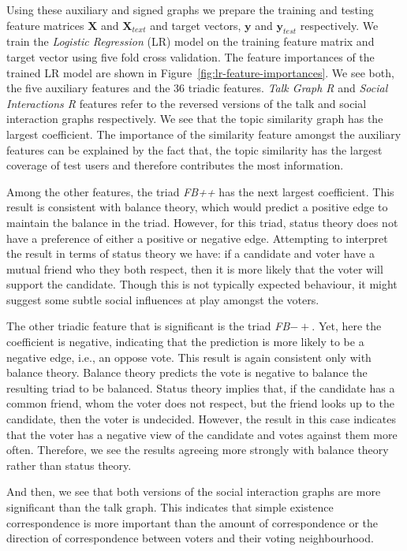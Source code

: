 Using these auxiliary and signed graphs we prepare the training and testing feature matrices $\mathbf{X}$ and $\mathbf{X}_{text}$ and target vectors, $\mathbf{y}$ and $\mathbf{y}_{test}$ respectively.
We train the \textit{Logistic Regression} (LR) model on the training feature matrix and target vector using five fold cross validation.
The feature importances of the trained LR model are shown in Figure~\ref{fig:lr-feature-importances}.
We see both, the five auxiliary features and the 36 triadic features.
\textit{Talk Graph R} and \textit{Social Interactions R} features refer to the reversed versions of the talk and social interaction graphs respectively.
We see that the topic similarity graph has the largest coefficient.
The importance of the similarity feature amongst the auxiliary features can be explained by the fact that, the topic similarity has the largest coverage of test users and therefore contributes the most information.

Among the other features, the triad \textit{FB++} has the next largest coefficient.
This result is consistent with balance theory, which would predict a positive edge to maintain the balance in the triad.
However, for this triad, status theory does not have a preference of either a positive or negative edge.
Attempting to interpret the result in terms of status theory we have: if a candidate and voter have a mutual friend who they both respect, then it is more likely that the voter will support the candidate.
Though this is not typically expected behaviour, it might suggest some subtle social influences at play amongst the voters. 

The other triadic feature that is significant is the triad \textit{FB}$-+$.
Yet, here the coefficient is negative, indicating that the prediction is more likely to be a negative edge, i.e., an oppose vote.
This result is again consistent only with balance theory.
Balance theory predicts the vote is negative to balance the resulting triad to be balanced.
Status theory implies that, if the candidate has a common friend, whom the voter does not respect, but the friend looks up to the candidate, then the voter is undecided.
However, the result in this case indicates that the voter has a negative view of the candidate and votes against them more often.
Therefore, we see the results agreeing more strongly with balance theory rather than status theory.

And then, we see that both versions of the social interaction graphs are more significant than the talk graph.
This indicates that simple existence correspondence is more important than the amount of correspondence or the direction of correspondence between voters and their voting neighbourhood.

